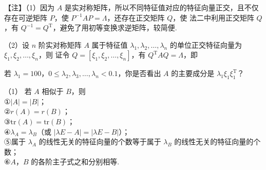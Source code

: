 \begin{fnote}
【注】（1）因为 $A$ 是实对称矩阵，所以不同特征值对应的特征向量正交，且不仅存在可逆矩阵 $P$，使 $P^{-1}AP=\Lambda$，还存在正交矩阵 $Q$，使
法二中利用正交矩阵 $Q$，有 $Q^{-1}=Q^{\mathrm T}$，避免了用初等变换求逆矩阵，较简便.

（2）设 $n$ 阶实对称矩阵 $A$ 属于特征值 $\lambda_1,\lambda_2,\dots,\lambda_n$ 的单位正交特征向量为 $\xi_1,\xi_2,\dots,\xi_n$，则
证\quad 令 $Q=[\xi_1,\xi_2,\dots,\xi_n]$，有 $Q^{\mathrm T}AQ=\Lambda$，即
\end{fnote}

若 $\lambda_1=100$，$0\le\lambda_2,\lambda_3,\dots,\lambda_n<0.1$，你是否看出 $A$ 的主要成分是 $\lambda_1\xi_1\xi_1^{\mathrm T}$？



\begin{fcard}{（1）}
若 $A$ 相似于 $B$，则\\
①$|A|=|B|$；\\
②$r(A)=r(B)$；\\
③$\mathrm{tr}(A)=\mathrm{tr}(B)$；\\
④$\lambda_A=\lambda_B$（或 $|\lambda E-A|=|\lambda E-B|$）；\\
⑤属于 $\lambda_A$ 的线性无关的特征向量的个数等于属于 $\lambda_B$ 的线性无关的特征向量的个数；\\
⑥$A$，$B$ 的各阶主子式之和分别相等.
\end{fcard}

